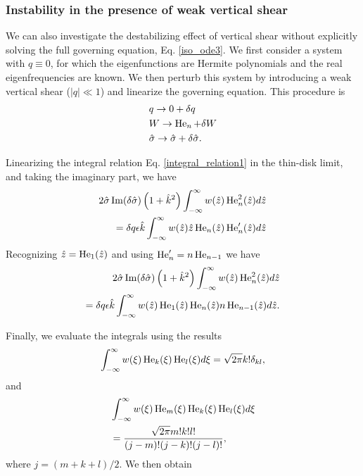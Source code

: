 \subsubsection{Instability in the presence of weak vertical shear}
We can also investigate the destabilizing effect of vertical shear
without explicitly solving the full governing equation,
Eq. \ref{iso_ode3}. We first
consider a system with $q\equiv0$, for which the eigenfunctions are
Hermite polynomials and the real eigenfrequencies are known. We then
perturb this system by introducing a weak vertical shear ($|q|\ll1$)
and linearize the governing equation. This procedure is
\begin{align}   
  &q \to 0 + \delta q\\
  &W \to \operatorname{He}_n + \delta W \\
  &\hat{\sigma} \to \hat{\sigma} + \delta\hat{\sigma}. 
\end{align}

Linearizing the integral relation Eq. \ref{integral_relation1} in the
thin-disk limit, and taking the
imaginary part, we have
\begin{align}
  2\hat{\sigma}\operatorname{Im}(\delta\hat{\sigma})
  \left(1+\hat{k}^2\right) \int_{-\infty}^{\infty} w(\hat{z})
  \operatorname{He}_n^2(\hat{z}) d\hat{z} \notag\\
  = \delta q \epsilon \hat{k} 
  \int_{-\infty}^{\infty}
  w(\hat{z})\hat{z}\operatorname{He}_n(\hat{z})\operatorname{He}_n^\prime(\hat{z}) d\hat{z}
\end{align}
Recognizing $\hat{z} = \operatorname{He}_1(\hat{z})$ and using $\operatorname{He}_n^\prime = n
\operatorname{He}_{n-1}$ we have
 \begin{align}
   2\hat{\sigma}\operatorname{Im}(\delta\hat{\sigma})
   \left(1+\hat{k}^2\right) \int_{-\infty}^{\infty} w(\hat{z})
   \operatorname{He}_n^2(\hat{z}) d\hat{z} \notag\\
   =\delta q \epsilon \hat{k} 
   \int_{-\infty}^{\infty}
   w(\hat{z})\operatorname{He}_1(\hat{z})\operatorname{He}_n(\hat{z})n\operatorname{He}_{n-1}(\hat{z})d\hat{z}. 
 \end{align}

Finally, we evaluate the integrals using the results
\begin{align}
  \int_{-\infty}^{\infty}
  w(\xi) \operatorname{He}_k(\xi)\operatorname{He}_l(\xi) d\xi = \sqrt{2\pi}k!\delta_{kl}, 
\end{align}
and
\begin{align}
  &\int_{-\infty}^{\infty}
  w(\xi) \operatorname{He}_m(\xi)\operatorname{He}_k(\xi)\operatorname{He}_l(\xi) d\xi\notag\\& =
  \frac{\sqrt{2\pi}m!k!l!}{(j-m)!(j-k)!(j-l)!}, 
\end{align}
where $j = (m+k+l)/2$. We then obtain

